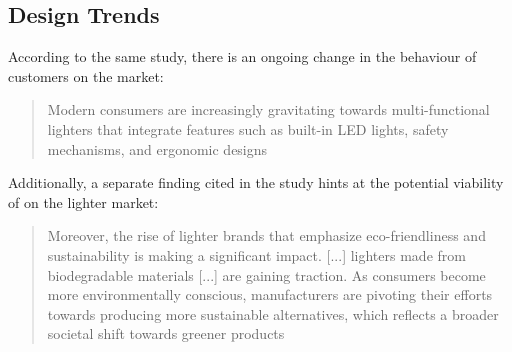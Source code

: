 \subsection{Design Trends}
According to the same study, there is an ongoing change in the behaviour of customers on the market:
\begin{quote}
	Modern consumers are increasingly gravitating towards multi-functional lighters that integrate features such
	as built-in LED lights, safety mechanisms, and ergonomic designs
\end{quote}
Additionally, a separate finding cited in the study hints at the potential viability of {\fw} on the lighter market:
\begin{quote}
	Moreover, the rise of lighter brands that emphasize eco-friendliness and sustainability is making a significant
	impact. [...] lighters made from biodegradable materials [...] are gaining traction.
	As consumers become more environmentally conscious, manufacturers are pivoting their
	efforts towards producing more sustainable alternatives, which reflects a broader societal shift towards greener
	products
\end{quote}
